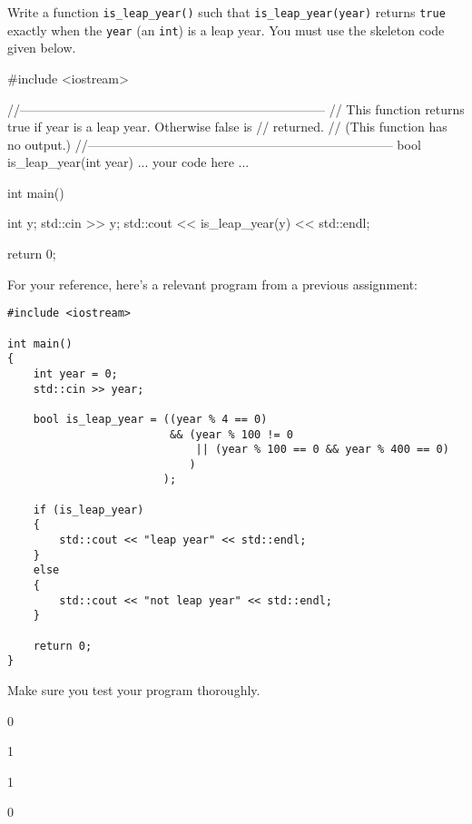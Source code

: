 Write a function \verb!is_leap_year()! such that \verb!is_leap_year(year)!
returns \verb!true! exactly when the \verb!year! (an \verb!int!) is a leap
year. You must use the skeleton code given below.
\begin{console}
#include <iostream>


//------------------------------------------------------------------------
// This function returns true if year is a leap year. Otherwise false is
// returned.
// (This function has no output.)
//------------------------------------------------------------------------
bool is_leap_year(int year)
{
    ... your code here ...
}


int main()
{
    int y;
    std::cin >> y;
    std::cout << is_leap_year(y) << std::endl;

    return 0;
}
\end{console}

For your reference, here's a relevant program from a previous assignment:
\begin{Verbatim}[frame=single]
#include <iostream>

int main()
{
    int year = 0;
    std::cin >> year;

    bool is_leap_year = ((year % 4 == 0)
                         && (year % 100 != 0
                             || (year % 100 == 0 && year % 400 == 0)
                            )
                        );

    if (is_leap_year)
    {
        std::cout << "leap year" << std::endl;
    }
    else
    {
        std::cout << "not leap year" << std::endl;
    }

    return 0;
}
\end{Verbatim}

Make sure you test your program thoroughly.

\resett
\nextt
\begin{console}[commandchars=\\\{\}]
0
\end{console}

\nextt
\begin{console}[commandchars=\\\{\}]
1
\end{console}

\nextt
\begin{console}[commandchars=\\\{\}]
1
\end{console}

\nextt
\begin{console}[commandchars=\\\{\}]
0
\end{console}
